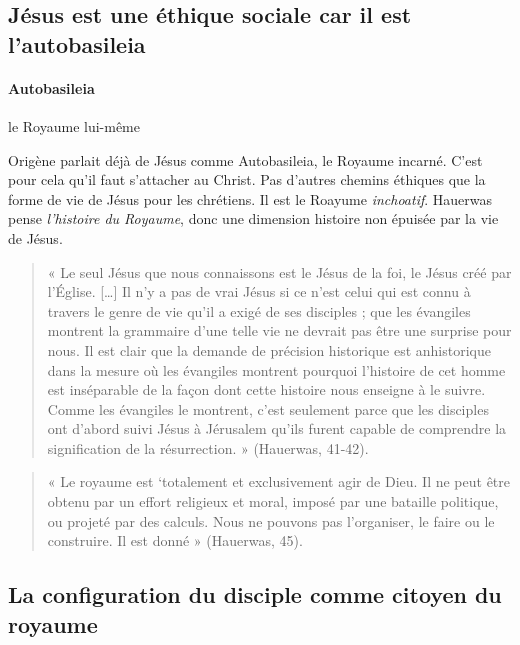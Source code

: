  \subsection{Jésus est une éthique sociale car il est l’autobasileia} 
 
 
\paragraph{Autobasileia} le Royaume lui-même


 Origène parlait déjà de Jésus comme Autobasileia, le Royaume incarné. C'est pour cela qu'il faut s'attacher au Christ. Pas d'autres chemins éthiques que la forme de vie de Jésus pour les chrétiens. Il est le Roayume \textit{inchoatif}. Hauerwas pense \textit{l'histoire du Royaume}, donc une dimension histoire non épuisée par la vie de Jésus.


\begin{quote}
    « Le seul Jésus que nous connaissons est le Jésus de la foi, le Jésus créé par l’Église. […] Il n’y a pas
de vrai Jésus si ce n’est celui qui est connu à travers le genre de vie qu’il a exigé de ses disciples ; que
les évangiles montrent la grammaire d’une telle vie ne devrait pas être une surprise pour nous. Il est
clair que la demande de précision historique est anhistorique dans la mesure où les évangiles montrent
pourquoi l’histoire de cet homme est inséparable de la façon dont cette histoire nous enseigne à le
suivre. Comme les évangiles le montrent, c’est seulement parce que les disciples ont d’abord suivi
Jésus à Jérusalem qu’ils furent capable de comprendre la signification de la résurrection. » (Hauerwas,
41-42).
\end{quote}


 \begin{quote}
     « Le royaume est ‘totalement et exclusivement agir de Dieu. Il ne peut être obtenu par un effort
religieux et moral, imposé par une bataille politique, ou projeté par des calculs. Nous ne pouvons pas
l’organiser, le faire ou le construire. Il est donné » (Hauerwas, 45).
 \end{quote}



\subsection{La configuration du disciple comme citoyen du royaume} 

